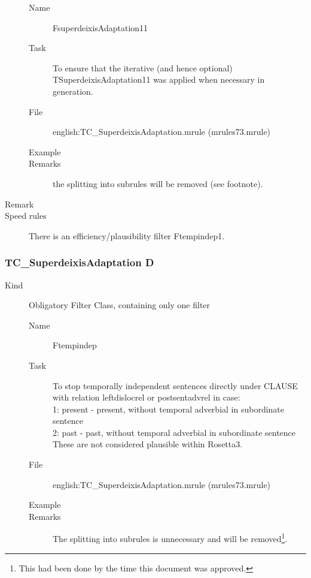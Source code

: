 \begin{description}
\vspace{1 cm}
\begin{description}
\item[Name]  FsuperdeixisAdaptation11
\item[Task] To ensure that the iterative (and hence optional) 
TSuperdeixisAdaptation11 was applied when necessary in generation.
\item[File] english:TC\_SuperdeixisAdaptation.mrule (mrules73.mrule)
\item[Example] 
\item[Remarks] 
the splitting into subrules will be removed (see footnote).
\end{description}

\item[Remark]
\item[Speed rules] There is an efficiency/plausibility filter Ftempindep1.
\end{description}

\newpage
\subsubsection{TC\_SuperdeixisAdaptation D}
\begin{description}
\item[Kind] Obligatory Filter Class, containing only one filter

\begin{description}
\item[Name] Ftempindep
\item[Task] 
To stop temporally independent sentences directly under CLAUSE with relation 
leftdislocrel or postsentadvrel in case:\\
1: present - present, without temporal adverbial in subordinate sentence\\
2: past - past, without temporal adverbial in subordinate sentence\\
These are not considered plausible within Rosetta3.

\item[File] english:TC\_SuperdeixisAdaptation.mrule (mrules73.mrule)
\item[Example] 
\item[Remarks] The splitting into subrules is unnecessary and will be 
removed\footnote{This had been done by the time this document was approved.}.
\end{description}


\end{description}


